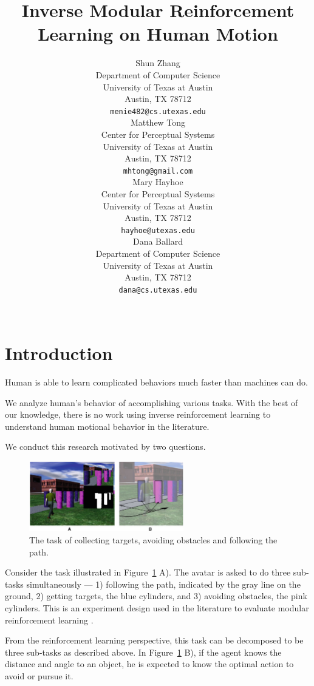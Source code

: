 \documentclass[11pt]{article} %
\title{Inverse Modular Reinforcement Learning on Human Motion}
\author{
Shun Zhang\\
Department of Computer Science\\
University of Texas at Austin\\
Austin, TX 78712 \\
\texttt{menie482@cs.utexas.edu} \\
\And
Matthew Tong \\
Center for Perceptual Systems\\
University of Texas at Austin\\
Austin, TX 78712 \\
\texttt{mhtong@gmail.com} \\
\AND
Mary Hayhoe \\
Center for Perceptual Systems\\
University of Texas at Austin\\
Austin, TX 78712 \\
\texttt{hayhoe@utexas.edu} \\
\And
Dana Ballard \\
Department of Computer Science\\
University of Texas at Austin\\
Austin, TX 78712 \\
\texttt{dana@cs.utexas.edu} \\
\\
}
\begin{document}
\maketitle

\begin{abstract}
\end{abstract}


\acknowledgements{}

\startmain %

\section{Introduction}

Human is able to learn complicated behaviors much faster than machines can do.

We analyze human's behavior of accomplishing various tasks. With the best of our
knowledge, there is no work using inverse reinforcement learning to understand
human motional behavior in the literature.

We conduct this research motivated by two questions.

\begin{figure}[h!]
\centering
\includegraphics[width=0.6\textwidth]{avatar.png}
\caption{The task of collecting targets, avoiding obstacles and following the
path.}
\label{fig:avatar}
\end{figure}

Consider the task illustrated in Figure~\ref{fig:avatar} A). The avatar is asked to
do three sub-tasks simultaneously --- 1) following the path, indicated by the gray
line on the ground, 2) getting targets, the blue cylinders, and 3) avoiding
obstacles, the pink cylinders. This is an experiment design used in the
literature to evaluate modular reinforcement learning \cite{rothkopf2013modular}.

From the reinforcement learning perspective, this task can be decomposed to be
three sub-tasks as described above.  In Figure~\ref{fig:avatar} B), if the agent
knows the distance and angle to an object, he is expected to know the optimal
action to avoid or pursue it.
\end{document}
